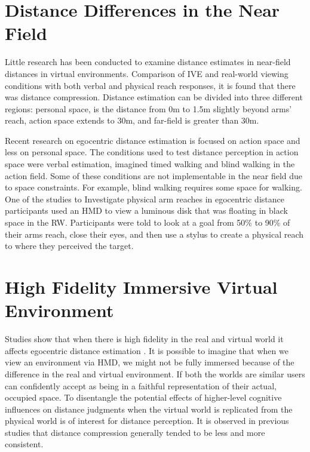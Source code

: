 \section{Distance Differences in the Near Field}
Little research has been conducted to examine distance estimates in near-field distances in virtual environments. Comparison of IVE and real-world viewing conditions with both verbal and physical reach responses, it is found that there was distance compression. Distance estimation can be divided into three different regions: personal space, is the distance from 0m to 1.5m slightly beyond arms’ reach, action space extends to 30m, and far-field is greater than 30m.\cite{cutting1995perceiving}\par 
Recent research on egocentric distance estimation is focused on action space and less on personal space. The conditions used to test distance perception in action space were verbal estimation, imagined timed walking and blind walking in the action field. Some of these conditions are not implementable in the near field due to space constraints. For example, blind walking requires some space for walking. One of the studies to Investigate physical arm reaches in egocentric distance participants used an HMD to view a luminous disk that was floating in black space in the RW. Participants were told to look at a goal from 50\% to 90\% of their arms reach, close their eyes, and then use a stylus to create a physical reach to where they perceived the target.\cite{singh2010depth}


\section{High Fidelity Immersive Virtual Environment}
Studies show that when there is high fidelity in the real and virtual world it affects egocentric distance estimation \cite{phillips2009distance}. It is possible to imagine that when we view an environment via HMD, we might not be fully immersed because of the difference in the real and virtual environment. If both the worlds are similar users can confidently accept as being in a faithful representation of their actual, occupied space. To disentangle the potential effects of higher-level cognitive influences on distance judgments when the virtual world is replicated from the physical world is of interest for distance perception. It is observed in previous studies that distance compression generally tended to be less and more consistent\cite{pagano2008expectation}.
